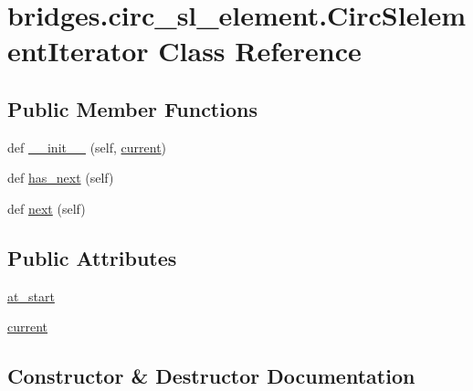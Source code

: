 \hypertarget{classbridges_1_1circ__sl__element_1_1_circ_slelement_iterator}{}\section{bridges.\+circ\+\_\+sl\+\_\+element.\+Circ\+Slelement\+Iterator Class Reference}
\label{classbridges_1_1circ__sl__element_1_1_circ_slelement_iterator}
\subsection*{Public Member Functions}
\begin{DoxyCompactItemize}
\item 
def \hyperlink{classbridges_1_1circ__sl__element_1_1_circ_slelement_iterator_a081b8d4a17e16ec7fc477f467b811007}{\+\_\+\+\_\+init\+\_\+\+\_\+} (self, \hyperlink{classbridges_1_1circ__sl__element_1_1_circ_slelement_iterator_a879125a1a62541594e35357236d07bff}{current})
\item 
def \hyperlink{classbridges_1_1circ__sl__element_1_1_circ_slelement_iterator_a689b88dd237c4005d00d29926c8e7a7e}{has\+\_\+next} (self)
\item 
def \hyperlink{classbridges_1_1circ__sl__element_1_1_circ_slelement_iterator_abd01093a17e982bfc2080e9e071c31ff}{next} (self)
\end{DoxyCompactItemize}
\subsection*{Public Attributes}
\begin{DoxyCompactItemize}
\item 
\hyperlink{classbridges_1_1circ__sl__element_1_1_circ_slelement_iterator_ab23b1bba4f10a4ec8998b0e1b1aff997}{at\+\_\+start}
\item 
\hyperlink{classbridges_1_1circ__sl__element_1_1_circ_slelement_iterator_a879125a1a62541594e35357236d07bff}{current}
\end{DoxyCompactItemize}


\subsection{Constructor \& Destructor Documentation}
\mbox{\label{classbridges_1_1circ__sl__element_1_1_circ_slelement_iterator_a081b8d4a17e16ec7fc477f467b811007}} 
